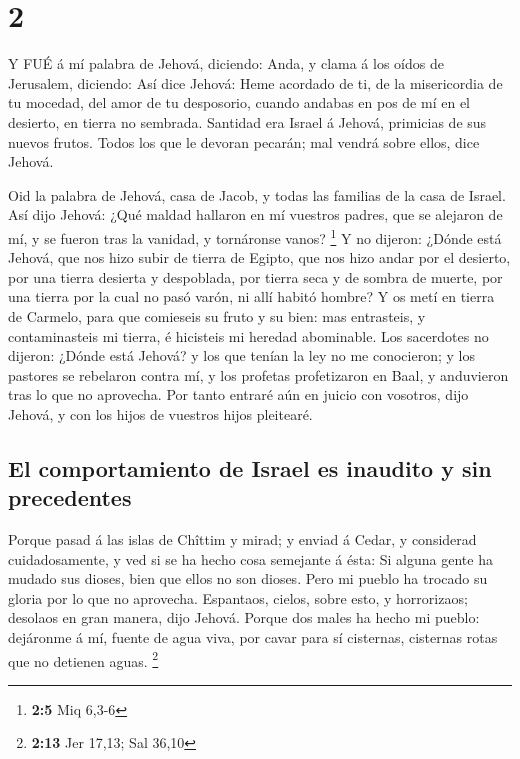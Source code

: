\hypertarget{section-1}{%
\section{2}\label{section-1}}

 Y FUÉ á mí palabra de Jehová, diciendo:  Anda,
y clama á los oídos de Jerusalem, diciendo: Así dice Jehová: Heme
acordado de ti, de la misericordia de tu mocedad, del amor de tu
desposorio, cuando andabas en pos de mí en el desierto, en tierra no
sembrada.  Santidad era Israel á Jehová, primicias de sus
nuevos frutos. Todos los que le devoran pecarán; mal vendrá sobre ellos,
dice Jehová.

 Oid la palabra de Jehová, casa de Jacob, y todas las
familias de la casa de Israel.  Así dijo Jehová: ¿Qué maldad
hallaron en mí vuestros padres, que se alejaron de mí, y se fueron tras
la vanidad, y tornáronse vanos? \footnote{\textbf{2:5} Miq 6,3-6}
 Y no dijeron: ¿Dónde está Jehová, que nos hizo subir de
tierra de Egipto, que nos hizo andar por el desierto, por una tierra
desierta y despoblada, por tierra seca y de sombra de muerte, por una
tierra por la cual no pasó varón, ni allí habitó hombre?  Y
os metí en tierra de Carmelo, para que comieseis su fruto y su bien: mas
entrasteis, y contaminasteis mi tierra, é hicisteis mi heredad
abominable.  Los sacerdotes no dijeron: ¿Dónde está Jehová?
y los que tenían la ley no me conocieron; y los pastores se rebelaron
contra mí, y los profetas profetizaron en Baal, y anduvieron tras lo que
no aprovecha.  Por tanto entraré aún en juicio con vosotros,
dijo Jehová, y con los hijos de vuestros hijos pleitearé.

\hypertarget{el-comportamiento-de-israel-es-inaudito-y-sin-precedentes}{%
\subsection{El comportamiento de Israel es inaudito y sin
precedentes}\label{el-comportamiento-de-israel-es-inaudito-y-sin-precedentes}}

 Porque pasad á las islas de Chîttim y mirad; y enviad á
Cedar, y considerad cuidadosamente, y ved si se ha hecho cosa semejante
á ésta:  Si alguna gente ha mudado sus dioses, bien que
ellos no son dioses. Pero mi pueblo ha trocado su gloria por lo que no
aprovecha.  Espantaos, cielos, sobre esto, y horrorizaos;
desolaos en gran manera, dijo Jehová.  Porque dos males ha
hecho mi pueblo: dejáronme á mí, fuente de agua viva, por cavar para sí
cisternas, cisternas rotas que no detienen aguas. \footnote{\textbf{2:13}
  Jer 17,13; Sal 36,10}

